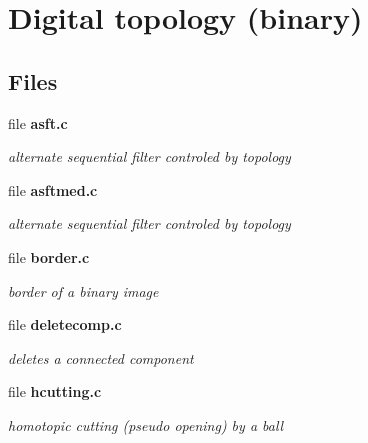 \section{Digital topology (binary)}
\label{group__topobin}
\subsection*{Files}
\begin{DoxyCompactItemize}
\item 
file {\bf asft.c}


\begin{DoxyCompactList}\small\item\em alternate sequential filter controled by topology \item\end{DoxyCompactList}

\item 
file {\bf asftmed.c}


\begin{DoxyCompactList}\small\item\em alternate sequential filter controled by topology \item\end{DoxyCompactList}

\item 
file {\bf border.c}


\begin{DoxyCompactList}\small\item\em border of a binary image \item\end{DoxyCompactList}

\item 
file {\bf deletecomp.c}


\begin{DoxyCompactList}\small\item\em deletes a connected component \item\end{DoxyCompactList}

\item 
file {\bf hcutting.c}


\begin{DoxyCompactList}\small\item\em homotopic cutting (pseudo opening) by a ball \item\end{DoxyCompactList}


\end{DoxyCompactItemize}
